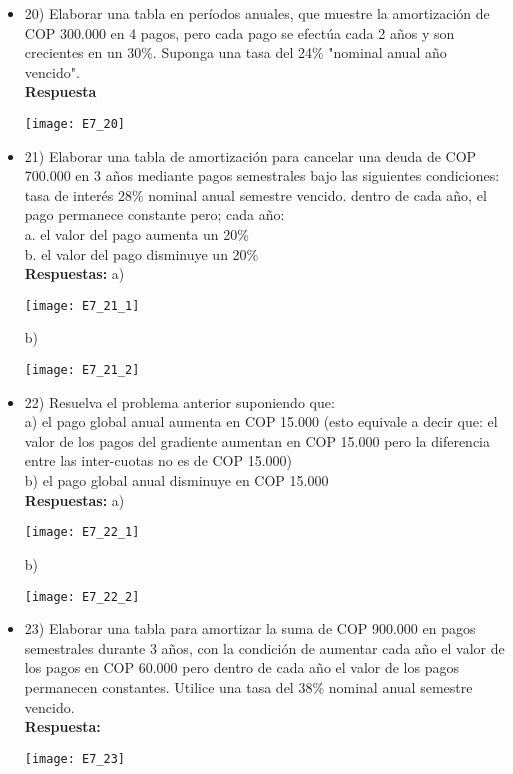 \begin{itemize}
 \item 20)	 Elaborar una tabla en períodos anuales, que muestre la amortización de COP 300.000 en 4 pagos, pero cada pago se efectúa cada 2 años y son crecientes en un 30\%. Suponga una tasa del 24\% "nominal anual año vencido".\\
       \textbf{Respuesta}
       \begin{center}
        \texttt{[image: E7\_20]}
       \end{center}
       \medskip

 \item 21)  Elaborar una tabla de amortización para cancelar una deuda de COP 700.000 en 3 años mediante pagos semestrales bajo las siguientes condiciones: tasa de interés 28\% nominal anual semestre vencido. dentro de cada año, el pago permanece constante pero; cada año:\\
       a.	el valor del pago aumenta un 20\% \\
       b.	el valor del pago disminuye un 20\% \\
       \textbf{Respuestas:}
       a)
       \begin{center}
        \texttt{[image: E7\_21\_1]}
       \end{center}
       b)
       \begin{center}
        \texttt{[image: E7\_21\_2]}
       \end{center}
       \medskip

 \item 22) Resuelva el problema anterior suponiendo que:\\

       a)	el pago global anual aumenta en COP 15.000 (esto equivale a decir que: el valor de los pagos del gradiente aumentan en COP 15.000 pero la diferencia entre las inter-cuotas no es de COP 15.000) \\
       b)	el pago global anual disminuye en COP 15.000\\
       \textbf{ Respuestas:}
       a)
       \begin{center}
        \texttt{[image: E7\_22\_1]}
       \end{center}
       b)
       \begin{center}
        \texttt{[image: E7\_22\_2]}
       \end{center}
       \medskip

 \item 23) Elaborar una tabla para amortizar la suma de COP 900.000 en pagos semestrales durante 3 años, con la condición de aumentar cada año el valor de los pagos en COP 60.000 pero dentro de cada año el valor de los pagos permanecen constantes. Utilice una tasa del 38\% nominal anual semestre vencido.\\
       \textbf{Respuesta:}\\
       \begin{center}
        \texttt{[image: E7\_23]}
       \end{center}
       \medskip


\end{itemize}

